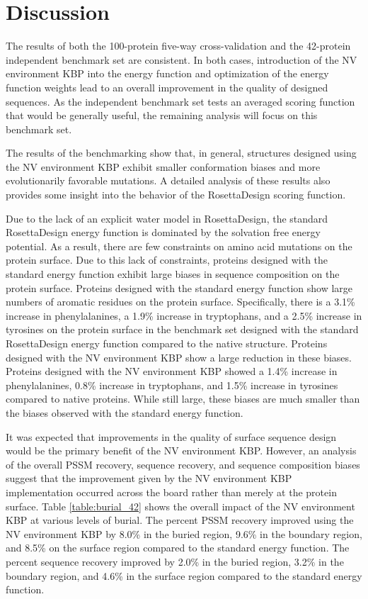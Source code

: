 \section{Discussion}

The results of both the 100-protein five-way cross-validation and the 42-protein independent benchmark set are consistent.
In both cases, introduction of the \ac{NV} environment \ac{KBP} into the energy function and optimization of the energy function weights lead to an overall improvement in the quality of designed sequences.
As the independent benchmark set tests an averaged scoring function that would be generally useful, the remaining analysis will focus on this benchmark set. 

The results of the benchmarking show that, in general, structures designed using the \ac{NV} environment \ac{KBP} exhibit smaller conformation biases and more evolutionarily favorable mutations.
A detailed analysis of these results also provides some insight into the behavior of the RosettaDesign scoring function.

Due to the lack of an explicit water model in RosettaDesign, the standard RosettaDesign energy function is dominated by the solvation free energy potential.
As a result, there are few constraints on amino acid mutations on the protein surface.
Due to this lack of constraints, proteins designed with the standard energy function exhibit large biases in sequence composition on the protein surface.
Proteins designed with the standard energy function show large numbers of aromatic residues on the protein surface.
Specifically, there is a 3.1\% increase in phenylalanines, a 1.9\% increase in tryptophans, and a 2.5\% increase in tyrosines on the protein surface in the benchmark set designed with the standard RosettaDesign energy function compared to the native structure.
Proteins designed with the \ac{NV} environment \ac{KBP} show a large reduction in these biases.
Proteins designed with the \ac{NV} environment \ac{KBP} showed a 1.4\% increase in phenylalanines, 0.8\% increase in tryptophans, and 1.5\% increase in tyrosines compared to native proteins.
While still large, these biases are much smaller than the biases observed with the standard energy function. 

It was expected that improvements in the quality of surface sequence design would be the primary benefit of the \ac{NV} environment \ac{KBP}.
However, an analysis of the overall \ac{PSSM} recovery, sequence recovery, and sequence composition biases suggest that the improvement given by the \ac{NV} environment \ac{KBP} implementation occurred across the board rather than merely at the protein surface.
Table \ref{table:burial_42} shows the overall impact of the \ac{NV} environment \ac{KBP} at various levels of burial.
The percent \ac{PSSM} recovery improved using the \ac{NV} environment \ac{KBP} by 8.0\% in the buried region, 9.6\% in the boundary region, and 8.5\% on the surface region compared to the standard energy function.
The percent sequence recovery improved by 2.0\% in the buried region, 3.2\% in the boundary region, and 4.6\% in the surface region compared to the standard energy function.
 
